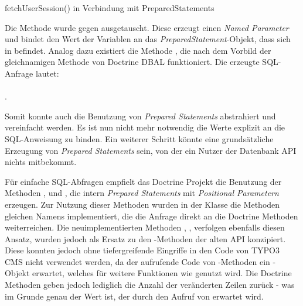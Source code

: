 \begin{listing}[H]
\begin{phpcode} 
$query = $this->db->createUpdateQuery();
$query->update($this->session_table)
  ->set('ses_tstamp', $GLOBALS['EXEC_TIME'])
  ->where(
    $query->expr->equals('ses_id', $query->bindValue($this->id)),
    $query->expr->equals('ses_name', $query->bindValue($this->name))
  )->execute();
}
\end{phpcode}
\caption{fetchUserSession() in Verbindung mit PreparedStatements}
\label{lst:fetchUserSessionAfterMigrationPreparedStatements}
\end{listing}


Die Methode  wurde gegen  ausgetauscht. Diese erzeugt einen \textit{Named Parameter} und bindet den Wert der Variablen an das \textit{PreparedStatement}-Objekt, dass sich in  befindet. Analog dazu existiert die Methode , die nach dem Vorbild der gleichnamigen Methode von Doctrine DBAL funktioniert. Die erzeugte SQL-Anfrage lautet:\\ \\ .

Somit konnte auch die Benutzung von \textit{Prepared Statements} abstrahiert und vereinfacht werden. Es ist nun nicht mehr notwendig die Werte explizit an die SQL-Anweisung zu binden. Ein weiterer Schritt könnte eine grundsätzliche Erzeugung von \textit{Prepared Statements} sein, von der ein Nutzer der Datenbank API nichts mitbekommt. 

Für einfache SQL-Abfragen empfielt das Doctrine Projekt die Benutzung der Methoden \phpinline{\Doctrine\DBAL\Connection\delete()}, \phpinline{\Doctrine\DBAL\Connection\update()} und \phpinline{\Doctrine\DBAL\Connection\insert()}, die intern \textit{Prepared Statements} mit \textit{Positional Parametern} erzeugen. Zur Nutzung dieser Methoden wurden in der Klasse \phpinline{\Konafets\DoctrineDbal\Persistence\Doctrine\DatabaseConnection} die Methoden gleichen Namens implementiert, die die Anfrage direkt an die Doctrine Methoden weiterreichen. Die neuimplementierten Methoden , ,  verfolgen ebenfalls diesen Ansatz, wurden jedoch als Ersatz zu den -Methoden der alten API konzipiert. Diese konnten jedoch ohne tiefergreifende Eingriffe in den Code von TYPO3 CMS nicht verwendet werden, da der aufrufende Code von -Methoden ein -Objekt erwartet, welches für weitere Funktionen wie  genutzt wird. Die Doctrine Methoden geben jedoch lediglich die Anzahl der veränderten Zeilen zurück - was im Grunde genau der Wert ist, der durch den Aufruf von  erwartet wird.
